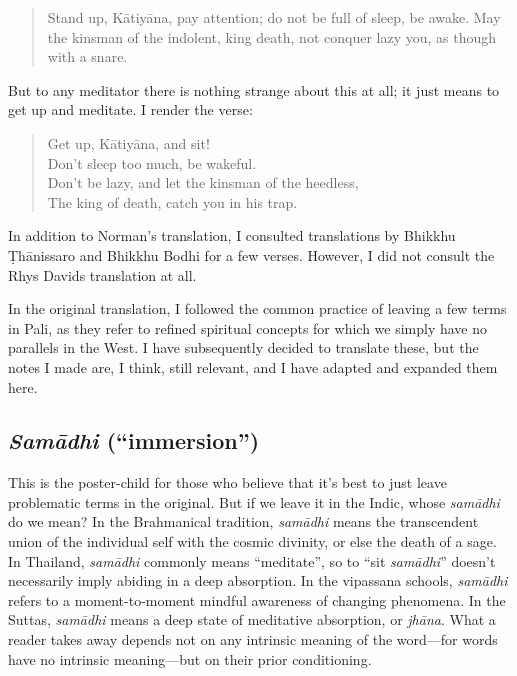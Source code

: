 \documentclass[12pt,openany]{book}%
\begin{document}
\begin{quotation}%
Stand up, \textsanskrit{Kātiyāna}, pay attention; do not be full of sleep, be awake. May the kinsman of the indolent, king death, not conquer lazy you, as though with a snare.

%
\end{quotation}

But to any meditator there is nothing strange about this at all; it just means to get up and meditate. I render the verse:

\begin{quotation}%
Get up, \textsanskrit{Kātiyāna}, and sit! \\
Don’t sleep too much, be wakeful. \\
Don’t be lazy, and let the kinsman of the heedless, \\
The king of death, catch you in his trap.

%
\end{quotation}

In addition to Norman’s translation, I consulted translations by Bhikkhu \textsanskrit{Ṭhānissaro} and Bhikkhu Bodhi for a few verses. However, I did not consult the Rhys Davids translation at all.

In the original translation, I followed the common practice of leaving a few terms in Pali, as they refer to refined spiritual concepts for which we simply have no parallels in the West. I have subsequently decided to translate these, but the notes I made are, I think, still relevant, and I have adapted and expanded them here.

\subsection*{\textit{\textsanskrit{Samādhi}} (“immersion”)}

This is the poster-child for those who believe that it’s best to just leave problematic terms in the original. But if we leave it in the Indic, whose \textit{\textsanskrit{samādhi}} do we mean? In the Brahmanical tradition, \textit{\textsanskrit{samādhi}} means the transcendent union of the individual self with the cosmic divinity, or else the death of a sage. In Thailand, \textit{\textsanskrit{samādhi}} commonly means “meditate”, so to “sit \textit{\textsanskrit{samādhi}}” doesn’t necessarily imply abiding in a deep absorption. In the vipassana schools, \textit{\textsanskrit{samādhi}} refers to a moment-to-moment mindful awareness of changing phenomena. In the Suttas, \textit{\textsanskrit{samādhi}} means a deep state of meditative absorption, or \textit{\textsanskrit{jhāna}}. What a reader takes away depends not on any intrinsic meaning of the word—for words have no intrinsic meaning—but on their prior conditioning.
\end{document}

